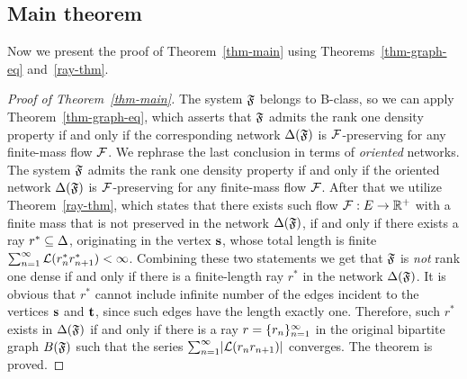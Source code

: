 \documentclass[12pt,oneside,a4paper]{amsart}
\begin{document}
      \subsection{Main theorem}
        Now we present the proof of Theorem~\ref{thm-main} using Theorems~\ref{thm-graph-eq} and~\ref{ray-thm}.
        \begin{proof}[Proof of Theorem~\ref{thm-main}]
          The system $\mathfrak{F}$ belongs to B-class, so we can apply Theorem~\ref{thm-graph-eq}, which asserts
            that $\mathfrak{F}$ admits the rank one density property if and only if
            the corresponding network $\Delta(\mathfrak{F})$ is $\mathcal{F}$-preserving for any
            finite-mass flow $\mathcal{F}$.
          We rephrase the last conclusion in terms of \emph{oriented} networks.
          The system $\mathfrak{F}$ admits the rank one density property if and only if
            the oriented network $\Delta(\mathfrak{F})$ is $\mathcal{F}$-preserving for any
            finite-mass flow $\mathcal{F}$.
          After that we utilize Theorem~\ref{ray-thm}, which states that there exists such
            flow $\mathcal{F}: E \to \mathbb{R}^{+}$ with a finite mass that is not preserved in
            the network $\Delta(\mathfrak{F})$, if and only if there exists a ray $r^{*} \subseteq \Delta$, originating in the vertex $\mathbf{s}$,
            whose total length is finite $\sum_{n=1}^\infty \mathcal{L}(r^{*}_n r^{*}_{n+1}) < \infty$.
          Combining these two statements we get that $\mathfrak{F}$ is \emph{not} rank one dense if and only if
            there is a finite-length ray $r^*$ in the network $\Delta(\mathfrak{F})$.
          It is obvious that $r^*$ cannot include infinite number of the edges incident to the vertices
            $\mathbf{s}$ and $\mathbf{t}$, since such edges have the length exactly one.
          Therefore, such $r^*$ exists in $\Delta(\mathfrak{F})$ if and only if there is a ray $r=\{{r}_n\}_{n=1}^\infty$ in the original bipartite graph $B(\mathfrak{F})$ such that
            the series $\sum_{n=1}^\infty\lvert\mathcal{L}(r_n r_{n+1})\rvert$ converges.
          The theorem is proved.
        \end{proof}
\end{document}
